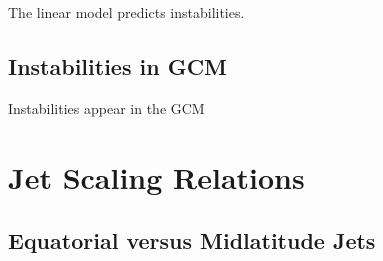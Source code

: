 The linear model predicts instabilities.

\subsection*{Instabilities in GCM}

Instabilities appear in the GCM




\section{Jet Scaling Relations}

\subsection*{Equatorial versus Midlatitude Jets}











% 
% 
